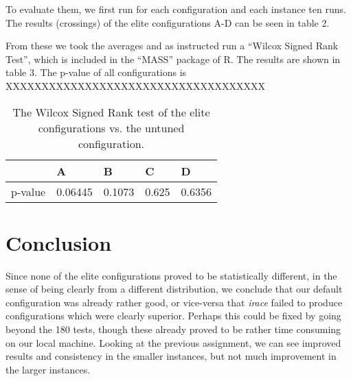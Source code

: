 \documentclass [11pt]{article}
\begin{document}
To evaluate them, we first run for each configuration and each instance ten runs. The results (crossings) of the elite configurations A-D can be seen in table 2.

From these we took the averages and as instructed run a ``Wilcox Signed Rank Test'', which is included in the ``MASS'' package of R. The results are shown in table 3. The p-value of all configurations is XXXXXXXXXXXXXXXXXXXXXXXXXXXXXXXXXXXX

\begin{table}[]
\centering
\caption{The Wilcox Signed Rank test of the elite configurations vs. the untuned configuration.}
\label{my-label}
\begin{tabular}{|l|l|l|l|l|}
\hline
        & A       & B      & C     & D      \\ \hline
p-value & 0.06445 & 0.1073 & 0.625 & 0.6356 \\ \hline
\end{tabular}
\end{table} 

\section{Conclusion}
Since none of the elite configurations proved to be statistically different, in the sense of being clearly from a different distribution, we conclude that our default configuration was already rather good, or vice-versa that \emph{irace} failed to produce configurations which were clearly superior. Perhaps this could be fixed by going beyond the 180 tests, though these already proved to be rather time consuming on our local machine. Looking at the previous assignment, we can see improved results and consistency in the smaller instances, but not much improvement in the larger instances.
\end{document}
